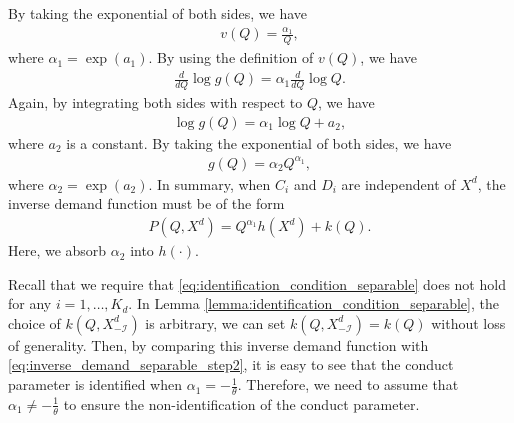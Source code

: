 \documentclass[11pt, a4paper]{article}
\theoremstyle{remark}
\begin{document}
By taking the exponential of both sides, we have
\begin{align}
    v(Q) = \frac{\alpha_1}{Q}, 
\end{align}
where $\alpha_1 = \exp(a_1)$.
By using the definition of $v(Q)$, we have
\begin{align}
    \frac{d }{d Q}\log g(Q) = \alpha_1\frac{d}{dQ}\log Q.
\end{align}
Again, by integrating both sides with respect to $Q$, we have
\begin{align}
    \log g(Q) = \alpha_1\log Q + a_2,
\end{align}
where $a_2$ is a constant.
By taking the exponential of both sides, we have
\begin{align}
    g(Q) = \alpha_2Q^{\alpha_1},
\end{align}
where $\alpha_2 = \exp(a_2)$.
In summary, when $C_i$ and $D_i$ are independent of $X^{d}$, the inverse demand function must be of the form
\begin{align}
    P(Q, X^{d}) = Q^{\alpha_1}h(X^{d}) + k(Q). \label{eq:inverse_demand_separable_step2}
\end{align}
Here, we absorb $\alpha_2$ into $h(\cdot)$.


Recall that we require that \eqref{eq:identification_condition_separable} does not hold for any $i = 1, \ldots, K_d$.
In Lemma \ref{lemma:identification_condition_separable}, the choice of $k(Q, X^{d}_{-\mathcal{I}})$ is arbitrary, we can set $k(Q, X^{d}_{-\mathcal{I}}) = k(Q)$ without loss of generality.
Then, by comparing this inverse demand function with \eqref{eq:inverse_demand_separable_step2}, it is easy to see that the conduct parameter is identified when $\alpha_1 = -\frac{1}{\theta}$.
Therefore, we need to assume that $\alpha_1 \ne -\frac{1}{\theta}$ to ensure the non-identification of the conduct parameter.
\end{document}
